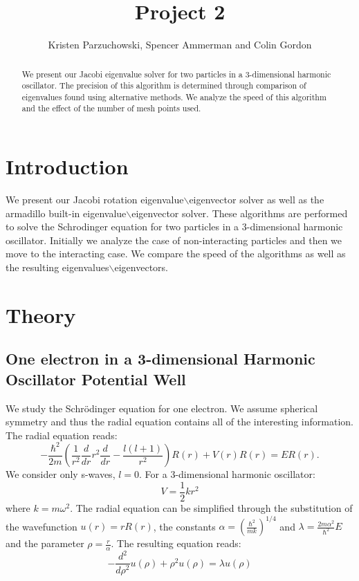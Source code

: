 \documentclass[10pt,showpacs,preprintnumbers,footinbib,amsmath,amssymb,aps,prl,twocolumn,groupedaddress,superscriptaddress,showkeys]{revtex4-1}
\begin{document}
\title{Project 2}
\author{Kristen Parzuchowski, Spencer Ammerman and Colin Gordon}
\begin{abstract}
We present our Jacobi eigenvalue solver for two particles in a 3-dimensional harmonic oscillator. The precision of this algorithm is determined through comparison of eigenvalues found using alternative methods. We analyze the speed of this algorithm and the effect of the number of mesh points used. %
\end{abstract}
\maketitle

\section{Introduction}
We present our Jacobi rotation eigenvalue$\backslash$eigenvector solver as well as the armadillo built-in eigenvalue$\backslash$eigenvector solver. These algorithms are performed to solve the Schrodinger equation for two particles in a 3-dimensional harmonic oscillator. Initially we analyze the case of non-interacting particles and then we move to the interacting case. We compare the speed of the algorithms as well as the resulting eigenvalues$\backslash$eigenvectors.
\section{Theory}
\subsection{One electron in a 3-dimensional Harmonic Oscillator Potential Well}
We study the Schr\"{o}dinger equation for one electron. We assume spherical symmetry and thus the radial equation contains all of the interesting information. The radial equation reads:
\begin{equation}
  -\frac{\hbar^2}{2 m} \left ( \frac{1}{r^2} \frac{d}{dr} r^2
  \frac{d}{dr} - \frac{l (l + 1)}{r^2} \right )R(r) 
     + V(r) R(r) = E R(r).
\end{equation}
We consider only s-waves, $l=0$. For a 3-dimensional harmonic oscillator:
\begin{equation}
{V=\frac{1}{2}kr^2}
\end{equation}
where $k = m\omega^2$. The radial equation can be simplified through the substitution of the wavefunction $u(r) = rR(r)$, the constants $\alpha = (\frac{\hbar^2}{mk})^{1/4}$ and $\lambda = \frac{2m\alpha^2}{\hbar^2}E$ and the parameter $\rho = \frac{r}{\alpha}$. The resulting equation reads:
\begin{equation}
-\frac{d^2}{d\rho^2}u(\rho)+\rho^2u(\rho) = \lambda u(\rho)
\end{equation}
\end{document}
